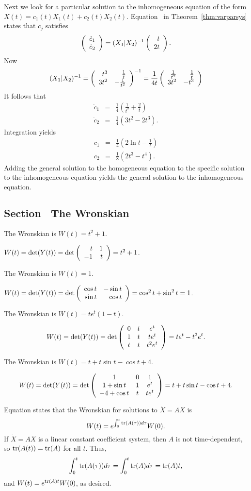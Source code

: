 Next we look for a particular solution to the inhomogeneous equation of 
the form $X(t)=c_1(t)X_1(t)+c_2(t)X_2(t)$.  Equation~ in
Theorem~\ref{thm:varparsys} states that $c_j$ satisfies
\[
\left(\begin{array}{r} \dot{c}_1 \\ \dot{c}_2\end{array}\right) = (X_1|X_2)^{-1} \left(\begin{array}{r} t \\ 2t\end{array}\right).
\]
Now 
\[
 (X_1|X_2)^{-1} = \left(\begin{array}{rr} t^3 & \frac{1}{t}\\ 3t^2 &-\frac{1}{t^2}\end{array}\right)^{-1} = 
\frac{1}{4t}\left(\begin{array}{rr} \frac{1}{t^2} & \frac{1}{t}\\ 3t^2 &-t^3\end{array}\right)
\]
It follows that 
\begin{eqnarray*}
\dot{c}_1 & = & \frac{1}{4}\left(\frac{1}{t^2}+\frac{2}{t}\right) \\
\dot{c}_2 & = & \frac{1}{4}\left(3t^2-2t^3\right).
\end{eqnarray*}
Integration yields
\begin{eqnarray*} 
c_1 & = & \frac{1}{4}\left(2\ln t - \frac{1}{t}\right)\\
c_2 & = & \frac{1}{8}\left(2t^3-t^4\right).
\end{eqnarray*}
Adding the general solution to the homogeneous equation to the specific
solution to the inhomogeneous equation yields the general solution to the
inhomogeneous equation.


\subsection*{Section~\protect{\ref{S:wronskian}} The Wronskian}

 \ans The Wronskian is $W(t) = t^2 + 1$.

\soln $W(t) = \det(Y(t)) = \det\left(\begin{array}{rr} t & 1\\ -1 &t\end{array}\right) = t^2 + 1$.

 \ans The Wronskian is $W(t) = 1$.

\soln $W(t) = \det(Y(t)) = \det\left(\begin{array}{rr} \cos t & -\sin t\\ \sin t &\cos t\end{array}\right) =
\cos^2 t + \sin^2 t = 1$.

 \ans The Wronskian is $W(t) = te^t(1 - t)$.

\soln
\[
W(t) = \det(Y(t)) = \det\left(\begin{array}{ccc} 0 & t & e^t \\ 1 & t & te^t \\ t & t & t^2e^t\end{array}\right)
= te^t - t^2e^t.
\]

 \ans The Wronskian is $W(t) = t + t\sin t - \cos t + 4$.

\soln
\[
W(t) = \det(Y(t)) =
\det\left(\begin{array}{ccc} 1 & 0 & 1 \\ 1 + \sin t & 1 & e^t \\ -4 + \cos t & t & te^t\end{array}\right) =
t + t\sin t - \cos t + 4.
\]

 Equation 
states that the Wronskian for solutions to $\dot{X} = AX$ is
\[
W(t) = e^{\int_0^t{\rm tr}(A(\tau))d\tau}W(0).
\]
If $\dot{X} = AX$ is a linear constant coefficient system, then $A$ is not
time-dependent, so ${\rm tr}(A(t)) = {\rm tr}(A)$ for all $t$.  Thus,
\[
\int_0^t{\rm tr}(A(\tau))d\tau = \int_0^t{\rm tr}(A)d\tau = {\rm tr}(A)t,
\]
and $W(t) = e^{{\rm tr}(A)t}W(0)$, as desired.

